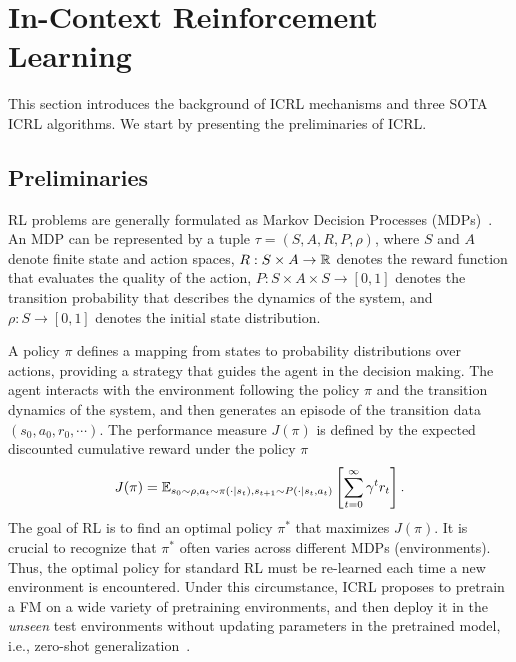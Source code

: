 %
%
\section{In-Context Reinforcement Learning}

%
This section introduces the background of ICRL mechanisms and three SOTA ICRL algorithms. We start by presenting the preliminaries of ICRL.

\subsection{Preliminaries}

RL problems are generally formulated as Markov Decision Processes (MDPs)~\citep{sutton2018reinforcement}.
An MDP can be represented by a tuple $\tau = (S, A, R, P, \rho)$, where $S$ and $A$ denote finite state and action spaces, $R: S \times A \to \mathbb{R}$ denotes the reward function that evaluates the quality of the action, $P: S \times A \times S \to [0, 1]$ denotes the transition probability that describes the dynamics of the system, and $\rho: S \to [0, 1]$ denotes the initial state distribution.  



A policy $\pi$ defines a mapping from states to probability distributions over actions, providing a strategy that guides the agent in the decision making.
%
The agent interacts with the environment following the policy $\pi$ and the transition dynamics of the system, and then generates an episode of the transition data $(s_0, a_0, r_0, \cdots)$.
%
The performance measure $J (\pi)$ is defined by the expected discounted cumulative reward under the policy $\pi$
\begin{align}
    J (\pi) = {\mathbb E}_{s_0 \sim \rho, a_t \sim \pi(\cdot | s_t), s_{t+1} \sim P(\cdot|s_t, a_t)} \left[ \sum_{t=0}^\infty \gamma^t r_t \right].
\end{align}
%
The goal of RL is to find an optimal policy $\pi^*$ that maximizes $J (\pi)$.
%
It is crucial to recognize that $\pi^*$ often varies across different MDPs (environments). Thus, the optimal policy for standard RL must be re-learned each time a new environment is encountered.
%
%
Under this circumstance, ICRL proposes to pretrain a FM on a wide variety of pretraining environments, and then deploy it in the \textit{unseen} test environments without updating parameters in the pretrained model, i.e., zero-shot generalization~\citep{sohn2018hierarchical, mazoure2022improving, zisselman2023explore, kirk2023survey}.



